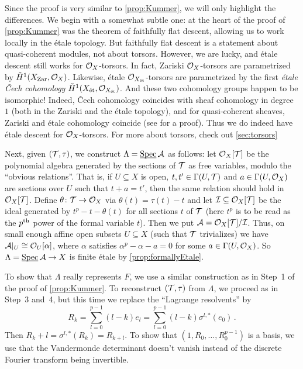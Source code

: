 \begin{proof*}
	Since the proof is very similar to \cref{prop:Kummer}, we will only highlight the differences. We begin with a somewhat subtle one: at the heart of the proof of \cref{prop:Kummer} was the theorem of faithfully flat descent, allowing us to work locally in the étale topology. But faithfully flat descent is a statement about quasi-coherent modules, not about torsors. However, we are lucky, and étale descent still works for $\mathcal{O}_X$-torsors. In fact, Zariski $\mathcal{O}_X$-torsors are parametrized by $\check{H}^1(X_{\mathrm{Zar}},\mathcal{O}_X)$. Likewise, étale $\mathcal{O}_{X_{\mathrm{\acute{e}t}}}$-torsors are parametrized by the first \emph{étale \v Cech cohomology} $\check{H}^1(X_{\mathrm{\acute{e}t}},\mathcal{O}_{X_{\mathrm{\acute{e}t}}})$. And these two cohomology groups happen to be isomorphic! Indeed, \v Cech cohomology coincides with sheaf cohomology in degree $1$ (both in the Zariski and the étale topology), and for quasi-coherent sheaves, Zariski and étale cohomology coincide (see \cite[]{stacks-project} for a proof). Thus we do indeed have étale descent for $\mathcal{O}_X$-torsors. For more about torsors, check out \cref{sec:torsors}
	
	Next, given $(\mathcal{T},\tau)$, we construct $\Lambda=\operatorname{\underline{\smash{\mathrm{Spec}}}}\mathcal{A}$ as follows: let $\mathcal{O}_X[\mathcal{T}]$ be the polynomial algebra generated by the sections of $\mathcal{T}$ as free variables, modulo the \enquote{obvious relations}. That is, if $U\subseteq X$ is open, $t,t'\in \operatorname{\Gamma}(U,\mathcal{T})$ and $a\in \operatorname{\Gamma}(U,\mathcal{O}_X)$ are sections over $U$ such that $t+a=t'$, then the same relation should hold in $\mathcal{O}_X[\mathcal{T}]$. Define $\theta\colon \Tt\morphism \Oo_X$ via $\theta(t)=\tau(t)-t$ and let $\mathcal{I}\subseteq \mathcal{O}_X[\mathcal{T}]$ be the ideal generated by $t^p-t-\theta(t)$ for all sections $t$ of $\mathcal{T}$ (here $t^p$ is to be read as the $p^{\text{th}}$ power of the formal variable $t$). Then we put $\mathcal{A}=\mathcal{O}_X[\mathcal{T}]/\mathcal{I}$. Thus, on small enough affine open subsets $U\subseteq X$ (such that $\mathcal{T}$ trivializes) we have $\mathcal{A}|_U\cong \mathcal{O}_U[\alpha]$, where $\alpha$ satisfies $\alpha^p-\alpha-a=0$ for some $a\in \operatorname{\Gamma}(U,\mathcal{O}_X)$. So $\Lambda=\SPEC\Aa\morphism X$ is finite étale by \cref{prop:formallyEtale}.
	
	To show that $\Lambda$ really represents $F$, we use a similar construction as in Step~1 of the proof of \cref{prop:Kummer}. To reconstruct $(\mathcal{T},\tau)$ from $\Lambda$, we proceed as in Step~3 and~4, but this time we replace the \enquote{Lagrange resolvents} by
	\begin{equation*}
		R_k=\sum_{l=0}^{p-1}(l-k)e_l=\sum_{l=0}^{p-1}(l-k)\sigma^{l,*}(e_0)\,.
	\end{equation*}
	Then $R_k+l=\sigma^{l,*}(R_k)=R_{k+l}$. To show that $(1,R_0,\dotsc,R_0^{p-1})$ is a basis, we use that the Vandermonde determinant doesn't vanish instead of the discrete Fourier transform being invertible. 
	

\end{proof*}
